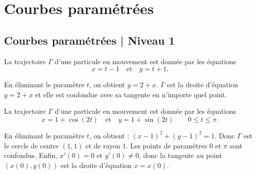 

\section{Courbes paramétrées}
\subsection{Courbes paramétrées | Niveau 1}

\begin{question}
La trajectoire $\Gamma$ d'une particule en mouvement est donnée par les équations
$$x=t-1\quad \mbox{et} \quad y=t+1.$$
\begin{answers}  
\end{answers}
\begin{explanations}
En éliminant le paramètre $t$, on obtient $y=2+x$. $\Gamma$ est la droite d'équation $y=2+x$ et elle est confondue avec sa tangente en n'importe quel point.
\end{explanations}
\end{question}

\begin{question}
La trajectoire $\Gamma$ d'une particule en mouvement est donnée par les équations
$$x=1+\cos (2t)\quad \mbox{et} \quad y=1+\sin (2t)\qquad 0\leq t\leq \pi.$$
\begin{answers}  
\end{answers}
\begin{explanations}
En éliminant le paramètre $t$, on obtient : $(x-1)^2+(y-1)^2=1$. Donc $\Gamma$ est le cercle de centre $(1,1)$ et de rayon $1$. Les points de paramètres $0$ et $\pi$ sont confondus. Enfin, $x'(0)=0$ et $y'(0)\neq 0$, donc la tangente au point $(x(0),y(0))$ est la droite d'équation $x=x(0)$.
\end{explanations}
\end{question}

